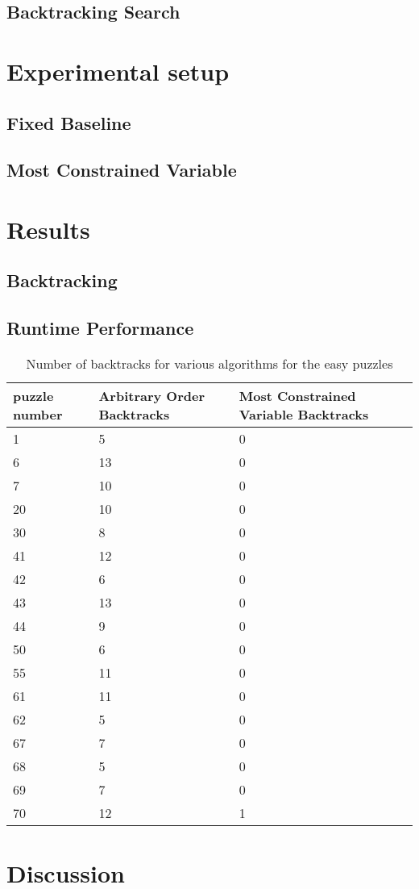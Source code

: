 \documentclass{article}
\begin{document}
   
   
 
 

\subsection{Backtracking Search}
  
\label{alg:Backtracking Search}
 

\section{Experimental setup}
\subsection{Fixed  Baseline}
\subsection{Most Constrained Variable}

\section{Results}
 \subsection{Backtracking}
\subsection{Runtime Performance}
\begin{table}[h]\centering
  \begin{tabular}{lll}
    \toprule
    puzzle number& Arbitrary Order Backtracks & Most Constrained Variable Backtracks\\
    \midrule
    1& 5 & 0\\
    \midrule
    6& 13&0\\
    \midrule
    7& 10&0\\
    \midrule
    20&10&0\\
    \midrule
    30& 8&0\\
    \midrule
    41& 12& 0\\
    \midrule
    42& 6& 0\\
    \midrule
    43& 13&0\\
    \midrule
    44&9&0\\
    \midrule
    50&6&0\\
    \midrule
    55 &11 &0\\
    \midrule
    61& 11 &0\\
    \midrule
    62 &5&0\\
    \midrule
    67&7&0\\
    \midrule
    68& 5&0\\
    \midrule
    69&7&0\\
    \midrule
    70& 12 &1\\
    \bottomrule
  \end{tabular}
  \caption{Number of backtracks for various algorithms for the easy puzzles}
  \label{tab:resultsEasy}
\end{table}
\section{Discussion}



  
\end{document}

